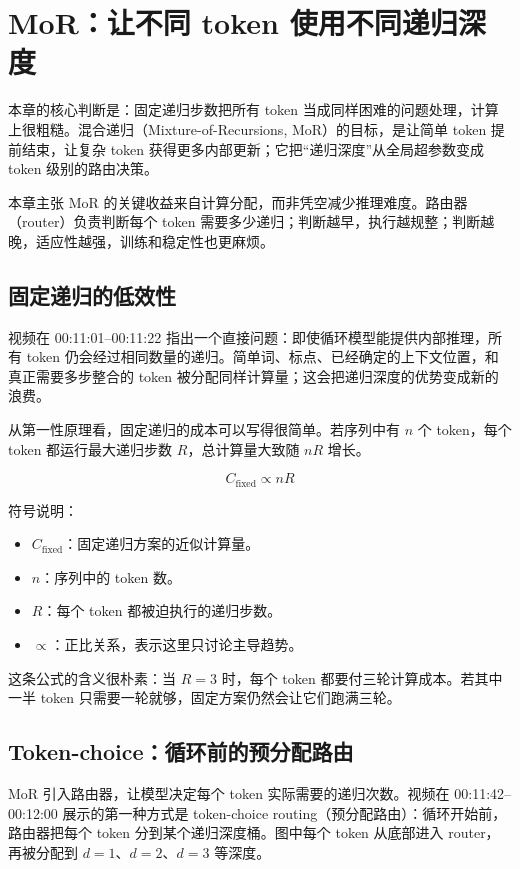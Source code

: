 \section{MoR：让不同 token 使用不同递归深度}
\label{sec:mixture-of-recursions}

本章的核心判断是：固定递归步数把所有 token 当成同样困难的问题处理，计算上很粗糙。混合递归（Mixture-of-Recursions, MoR）的目标，是让简单 token 提前结束，让复杂 token 获得更多内部更新；它把“递归深度”从全局超参数变成 token 级别的路由决策。

\begin{importantbox}{本章主张}
MoR 的关键收益来自计算分配，而非凭空减少推理难度。路由器（router）负责判断每个 token 需要多少递归；判断越早，执行越规整；判断越晚，适应性越强，训练和稳定性也更麻烦。
\end{importantbox}

\subsection{固定递归的低效性}

视频在 00:11:01--00:11:22 指出一个直接问题：即使循环模型能提供内部推理，所有 token 仍会经过相同数量的递归。简单词、标点、已经确定的上下文位置，和真正需要多步整合的 token 被分配同样计算量；这会把递归深度的优势变成新的浪费。

从第一性原理看，固定递归的成本可以写得很简单。若序列中有 \(n\) 个 token，每个 token 都运行最大递归步数 \(R\)，总计算量大致随 \(nR\) 增长。

\[
C_{\mathrm{fixed}}\propto nR
\]

符号说明：
\begin{itemize}
  \item \(C_{\mathrm{fixed}}\)：固定递归方案的近似计算量。
  \item \(n\)：序列中的 token 数。
  \item \(R\)：每个 token 都被迫执行的递归步数。
  \item \(\propto\)：正比关系，表示这里只讨论主导趋势。
\end{itemize}

这条公式的含义很朴素：当 \(R=3\) 时，每个 token 都要付三轮计算成本。若其中一半 token 只需要一轮就够，固定方案仍然会让它们跑满三轮。

\subsection{Token-choice：循环前的预分配路由}

MoR 引入路由器，让模型决定每个 token 实际需要的递归次数。视频在 00:11:42--00:12:00 展示的第一种方式是 token-choice routing（预分配路由）：循环开始前，路由器把每个 token 分到某个递归深度桶。图中每个 token 从底部进入 router，再被分配到 \(d=1\)、\(d=2\)、\(d=3\) 等深度。

